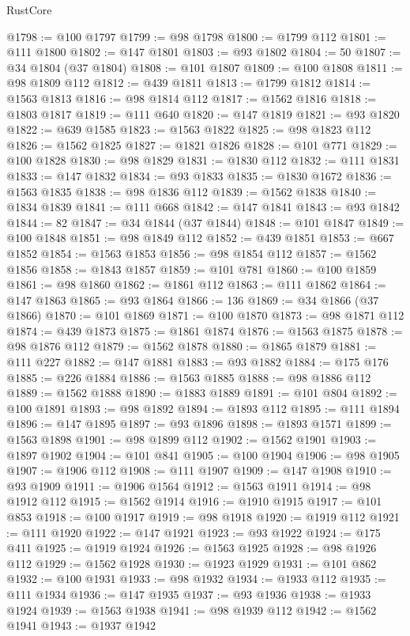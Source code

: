 \begin{lexlean}{RustCore}
\begin{coremodule}
@1798 := @100 @1797
@1799 := @98 @1798
@1800 := @1799 @112
@1801 := @111 @1800
@1802 := @147 @1801
@1803 := @93 @1802
@1804 := 50
@1807 := @34 @1804 (@37 @1804)
@1808 := @101 @1807
@1809 := @100 @1808
@1811 := @98 @1809 @112
@1812 := @439 @1811
@1813 := @1799 @1812
@1814 := @1563 @1813
@1816 := @98 @1814 @112
@1817 := @1562 @1816
@1818 := @1803 @1817
@1819 := @111 @640
@1820 := @147 @1819
@1821 := @93 @1820
@1822 := @639 @1585
@1823 := @1563 @1822
@1825 := @98 @1823 @112
@1826 := @1562 @1825
@1827 := @1821 @1826
@1828 := @101 @771
@1829 := @100 @1828
@1830 := @98 @1829
@1831 := @1830 @112
@1832 := @111 @1831
@1833 := @147 @1832
@1834 := @93 @1833
@1835 := @1830 @1672
@1836 := @1563 @1835
@1838 := @98 @1836 @112
@1839 := @1562 @1838
@1840 := @1834 @1839
@1841 := @111 @668
@1842 := @147 @1841
@1843 := @93 @1842
@1844 := 82
@1847 := @34 @1844 (@37 @1844)
@1848 := @101 @1847
@1849 := @100 @1848
@1851 := @98 @1849 @112
@1852 := @439 @1851
@1853 := @667 @1852
@1854 := @1563 @1853
@1856 := @98 @1854 @112
@1857 := @1562 @1856
@1858 := @1843 @1857
@1859 := @101 @781
@1860 := @100 @1859
@1861 := @98 @1860
@1862 := @1861 @112
@1863 := @111 @1862
@1864 := @147 @1863
@1865 := @93 @1864
@1866 := 136
@1869 := @34 @1866 (@37 @1866)
@1870 := @101 @1869
@1871 := @100 @1870
@1873 := @98 @1871 @112
@1874 := @439 @1873
@1875 := @1861 @1874
@1876 := @1563 @1875
@1878 := @98 @1876 @112
@1879 := @1562 @1878
@1880 := @1865 @1879
@1881 := @111 @227
@1882 := @147 @1881
@1883 := @93 @1882
@1884 := @175 @176
@1885 := @226 @1884
@1886 := @1563 @1885
@1888 := @98 @1886 @112
@1889 := @1562 @1888
@1890 := @1883 @1889
@1891 := @101 @804
@1892 := @100 @1891
@1893 := @98 @1892
@1894 := @1893 @112
@1895 := @111 @1894
@1896 := @147 @1895
@1897 := @93 @1896
@1898 := @1893 @1571
@1899 := @1563 @1898
@1901 := @98 @1899 @112
@1902 := @1562 @1901
@1903 := @1897 @1902
@1904 := @101 @841
@1905 := @100 @1904
@1906 := @98 @1905
@1907 := @1906 @112
@1908 := @111 @1907
@1909 := @147 @1908
@1910 := @93 @1909
@1911 := @1906 @1564
@1912 := @1563 @1911
@1914 := @98 @1912 @112
@1915 := @1562 @1914
@1916 := @1910 @1915
@1917 := @101 @853
@1918 := @100 @1917
@1919 := @98 @1918
@1920 := @1919 @112
@1921 := @111 @1920
@1922 := @147 @1921
@1923 := @93 @1922
@1924 := @175 @411
@1925 := @1919 @1924
@1926 := @1563 @1925
@1928 := @98 @1926 @112
@1929 := @1562 @1928
@1930 := @1923 @1929
@1931 := @101 @862
@1932 := @100 @1931
@1933 := @98 @1932
@1934 := @1933 @112
@1935 := @111 @1934
@1936 := @147 @1935
@1937 := @93 @1936
@1938 := @1933 @1924
@1939 := @1563 @1938
@1941 := @98 @1939 @112
@1942 := @1562 @1941
@1943 := @1937 @1942

\end{coremodule}
\end{lexlean}
